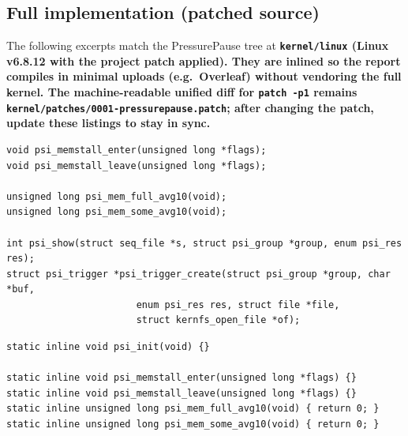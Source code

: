 \documentclass[12pt,a4paper]{article}
\newcommand{\srcfile}[1]{\begingroup\bfseries\color{aublue}\nolinkurl{#1}\endgroup}
\begin{document}
\subsection{Full implementation (patched source)}

The following excerpts match the PressurePause tree at \srcfile{kernel/linux} (Linux v6.8.12 with the project patch applied). They are inlined so the report compiles in minimal uploads (e.g.\ Overleaf) without vendoring the full kernel. The machine-readable unified diff for \texttt{patch -p1} remains \srcfile{kernel/patches/0001-pressurepause.patch}; after changing the patch, update these listings to stay in sync.

\begin{codebox}
\begin{lstlisting}[style=cstyle]
void psi_memstall_enter(unsigned long *flags);
void psi_memstall_leave(unsigned long *flags);

unsigned long psi_mem_full_avg10(void);
unsigned long psi_mem_some_avg10(void);

int psi_show(struct seq_file *s, struct psi_group *group, enum psi_res res);
struct psi_trigger *psi_trigger_create(struct psi_group *group, char *buf,
				       enum psi_res res, struct file *file,
				       struct kernfs_open_file *of);
\end{lstlisting}
\end{codebox}

\begin{codebox}
\begin{lstlisting}[style=cstyle]
static inline void psi_init(void) {}

static inline void psi_memstall_enter(unsigned long *flags) {}
static inline void psi_memstall_leave(unsigned long *flags) {}
static inline unsigned long psi_mem_full_avg10(void) { return 0; }
static inline unsigned long psi_mem_some_avg10(void) { return 0; }
\end{lstlisting}
\end{codebox}
\end{document}
